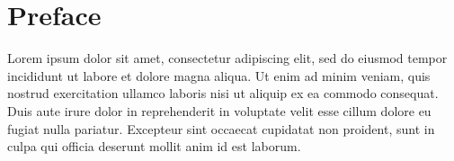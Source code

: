 \chapter*{Preface}

Lorem ipsum dolor sit amet, consectetur adipiscing elit, sed do eiusmod tempor incididunt ut 
labore et dolore magna aliqua. Ut enim ad minim veniam, quis nostrud exercitation ullamco 
laboris nisi ut aliquip ex ea commodo consequat. Duis aute irure dolor in reprehenderit in 
voluptate velit esse cillum dolore eu fugiat nulla pariatur. Excepteur sint occaecat cupidatat 
non proident, sunt in culpa qui officia deserunt mollit anim id est laborum.
%
